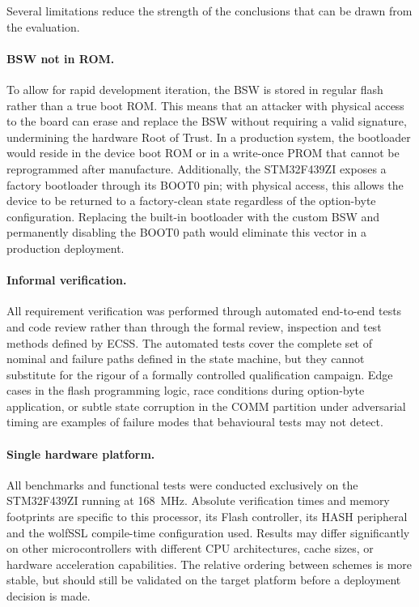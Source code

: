 Several limitations reduce the strength of the conclusions that can be drawn from the evaluation.

\paragraph{BSW not in ROM.}
To allow for rapid development iteration, the BSW is stored in regular flash rather than a true boot ROM. This means that an attacker with physical access to the board can erase and replace the BSW without requiring a valid signature, undermining the hardware Root of Trust. In a production system, the bootloader would reside in the device boot ROM or in a write-once PROM that cannot be reprogrammed after manufacture. Additionally, the STM32F439ZI exposes a factory bootloader through its BOOT0 pin; with physical access, this allows the device to be returned to a factory-clean state regardless of the option-byte configuration. Replacing the built-in bootloader with the custom BSW and permanently disabling the BOOT0 path would eliminate this vector in a production deployment.

\paragraph{Informal verification.}
All requirement verification was performed through automated end-to-end tests and code review rather than through the formal review, inspection and test methods defined by ECSS. The automated tests cover the complete set of nominal and failure paths defined in the state machine, but they cannot substitute for the rigour of a formally controlled qualification campaign. Edge cases in the flash programming logic, race conditions during option-byte application, or subtle state corruption in the COMM partition under adversarial timing are examples of failure modes that behavioural tests may not detect.

\paragraph{Single hardware platform.}
All benchmarks and functional tests were conducted exclusively on the STM32F439ZI running at 168~MHz. Absolute verification times and memory footprints are specific to this processor, its Flash controller, its HASH peripheral and the wolfSSL compile-time configuration used. Results may differ significantly on other microcontrollers with different CPU architectures, cache sizes, or hardware acceleration capabilities. The relative ordering between schemes is more stable, but should still be validated on the target platform before a deployment decision is made.

